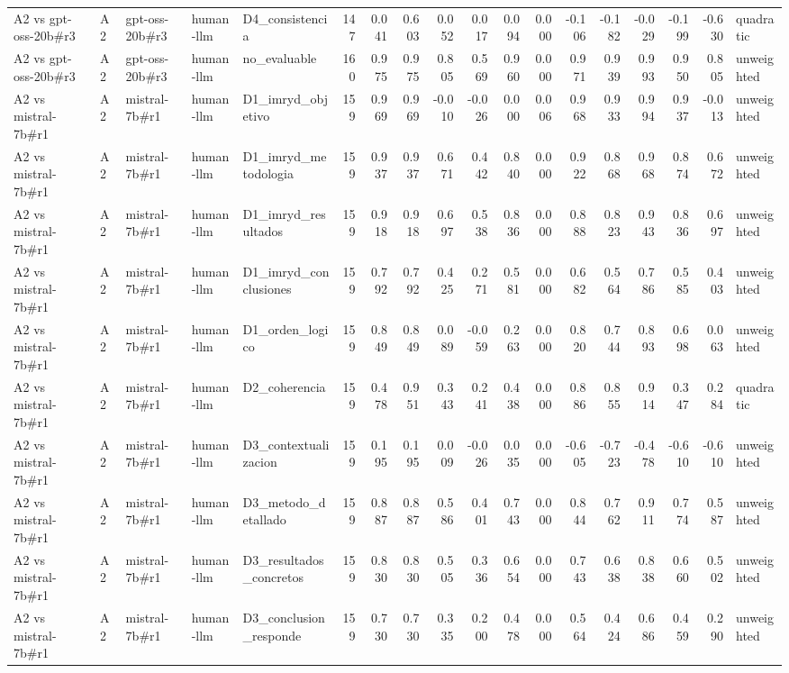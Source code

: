 \begin{table}
{\begin{tabular}{lllllrrrrrrrrrrrrl}
A2 vs gpt-oss-20b\#r3 & A2 & gpt-oss-20b\#r3 & human-llm & D4\_consistencia & 147 & 0.041 & 0.603 & 0.052 & 0.017 & 0.094 & 0.000 & -0.106 & -0.182 & -0.029 & -0.199 & -0.630 & quadratic \\
A2 vs gpt-oss-20b\#r3 & A2 & gpt-oss-20b\#r3 & human-llm & no\_evaluable & 160 & 0.975 & 0.975 & 0.805 & 0.569 & 0.960 & 0.000 & 0.971 & 0.939 & 0.993 & 0.950 & 0.805 & unweighted \\
A2 vs mistral-7b\#r1 & A2 & mistral-7b\#r1 & human-llm & D1\_imryd\_objetivo & 159 & 0.969 & 0.969 & -0.010 & -0.026 & 0.000 & 0.006 & 0.968 & 0.933 & 0.994 & 0.937 & -0.013 & unweighted \\
A2 vs mistral-7b\#r1 & A2 & mistral-7b\#r1 & human-llm & D1\_imryd\_metodologia & 159 & 0.937 & 0.937 & 0.671 & 0.442 & 0.840 & 0.000 & 0.922 & 0.868 & 0.968 & 0.874 & 0.672 & unweighted \\
A2 vs mistral-7b\#r1 & A2 & mistral-7b\#r1 & human-llm & D1\_imryd\_resultados & 159 & 0.918 & 0.918 & 0.697 & 0.538 & 0.836 & 0.000 & 0.888 & 0.823 & 0.943 & 0.836 & 0.697 & unweighted \\
A2 vs mistral-7b\#r1 & A2 & mistral-7b\#r1 & human-llm & D1\_imryd\_conclusiones & 159 & 0.792 & 0.792 & 0.425 & 0.271 & 0.581 & 0.000 & 0.682 & 0.564 & 0.786 & 0.585 & 0.403 & unweighted \\
A2 vs mistral-7b\#r1 & A2 & mistral-7b\#r1 & human-llm & D1\_orden\_logico & 159 & 0.849 & 0.849 & 0.089 & -0.059 & 0.263 & 0.000 & 0.820 & 0.744 & 0.893 & 0.698 & 0.063 & unweighted \\
A2 vs mistral-7b\#r1 & A2 & mistral-7b\#r1 & human-llm & D2\_coherencia & 159 & 0.478 & 0.951 & 0.343 & 0.241 & 0.438 & 0.000 & 0.886 & 0.855 & 0.914 & 0.347 & 0.284 & quadratic \\
A2 vs mistral-7b\#r1 & A2 & mistral-7b\#r1 & human-llm & D3\_contextualizacion & 159 & 0.195 & 0.195 & 0.009 & -0.026 & 0.035 & 0.000 & -0.605 & -0.723 & -0.478 & -0.610 & -0.610 & unweighted \\
A2 vs mistral-7b\#r1 & A2 & mistral-7b\#r1 & human-llm & D3\_metodo\_detallado & 159 & 0.887 & 0.887 & 0.586 & 0.401 & 0.743 & 0.000 & 0.844 & 0.762 & 0.911 & 0.774 & 0.587 & unweighted \\
A2 vs mistral-7b\#r1 & A2 & mistral-7b\#r1 & human-llm & D3\_resultados\_concretos & 159 & 0.830 & 0.830 & 0.505 & 0.336 & 0.654 & 0.000 & 0.743 & 0.638 & 0.838 & 0.660 & 0.502 & unweighted \\
A2 vs mistral-7b\#r1 & A2 & mistral-7b\#r1 & human-llm & D3\_conclusion\_responde & 159 & 0.730 & 0.730 & 0.335 & 0.200 & 0.478 & 0.000 & 0.564 & 0.424 & 0.686 & 0.459 & 0.290 & unweighted \\

\end{tabular}}
\end{table}
